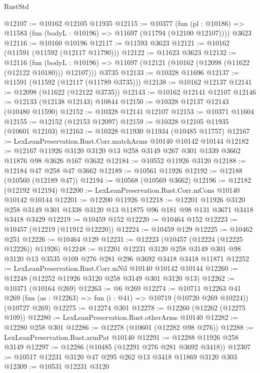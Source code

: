 \begin{lexlean}{RustStd}
\begin{coremodule}
@12107 := @10162 @12105 @11935
@12115 := @10377
    (fun (pl : @10186) => @11583 (fun (bodyL : @10196) => @11697 (@11794 (@12100 @12107))))
    @3623
@12116 := @10160 @10196
@12117 := @11593 @3623
@12121 := @10162 (@11591 (@11592 (@12117 @11790)))
@12122 := @11623 @3623
@12132 := @12116
    (fun (bodyL : @10196) => @11697 (@12121 (@10162 (@12098 (@11622 (@12122 @10180))) @12107)))
    @3735
@12133 := @10328 @11696
@12137 := @11591 (@11592 (@12117 (@11789 @3735)))
@12138 := @10162 @12137
@12141 := @12098 (@11622 (@12122 @3735))
@12143 := @10162 @12141 @12107
@12146 := @12133 (@12138 @12143) @10844
@12150 := @10328 @12137 @12143 (@10480 @11590)
@12152 := @10328 @12141 @12107
@12153 := @10371 @11604
@12155 := @12152 (@12153 @12097)
@12159 := @10328 @12105 @11935 (@10601 @12103)
@12163 := @10328 @11930 @11934 (@10485 @11757)
@12167 := LexLeanPreservation.Rust.Corr.matchArms @10140 @10142 @10144
@12182 := @12167 @11926 @3120 @3120 @13 @258 @3149 @267 @301 @1339 @3662 @11876 @98 @3626 @167 @3632
@12184 := @10552 @11926 @3120
@12188 := @12184 @47 @258 @47 @3662
@12189 := @10561 @11926
@12192 := @12188 (@10560 (@12189 @47))
@12194 := @10568 (@10569 @3662)
@12196 := @12182 (@12192 @12194)
@12200 := LexLeanPreservation.Rust.Corr.mCons @10140 @10142 @10144
@12201 := @12200 @11926
@12218 := @12201
    @11926
    @3120
    @258
    @3149
    @301
    @1338
    @3120
    @13
    @11875
    @96
    @181
    @98
    @131
    @3671
    @3418
    @3418
    @3429
@12219 := @10459 @152
@12220 := @10464 @152
@12223 := @10457 (@12219 (@11912 @12220))
@12224 := @10459 @129
@12225 := @10462 @251
@12226 := @10464 @129
@12231 := @12223 (@10457 (@12224 (@12225 @12226)) @11926)
@12248 := @12201
    @12231
    @3120
    @258
    @3149
    @301
    @98
    @3120
    @13
    @3535
    @109
    @276
    @281
    @296
    @3692
    @3418
    @3418
    @11871
@12252 := LexLeanPreservation.Rust.Corr.mNil @10140 @10142 @10144
@12260 := @12248 (@12252 @11926 @3120 @258 @3149 @301 @3120 @13)
@12262 := @10371 (@10164 @269)
@12263 := @6 @269
@12274 := @10711
    @12263
    @41
    @269
    (fun (as : @12263) => fun (i : @41) => @10719 (@10720 @269 @10224))
    (@10727 @269)
@12275 := @12274 @301
@12278 := @12260 (@12262 (@12275 @109))
@12280 := LexLeanPreservation.Rust.otherArms @10140
@12282 := @12280 @258 @301
@12286 := @12278 (@10601 (@12282 @98 @276))
@12288 := LexLeanPreservation.Rust.armPat @10140
@12291 := @12288 @11926 @258 @3149
@12297 := @12286 (@10485 (@12291 @276 @281 @3692 @3418))
@12307 := @10517 @12231 @3120 @47 @295 @262 @13 @3418 @11869 @3120 @303
@12309 := @10531 @12231 @3120

\end{coremodule}
\end{lexlean}
